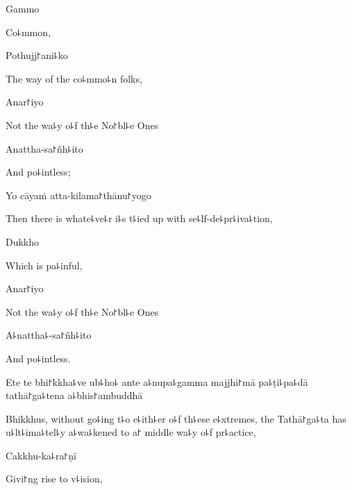 Gammo

\begin{english}
  Co꜕mmon,
\end{english}

Pothujj꜓ani꜕ko

\begin{english}
  The way of the co꜕mmo꜕n folks,
\end{english}

Anar꜓iyo

\begin{english}
  Not the wa꜕y o꜕f th꜕e No꜓bl꜕e Ones
\end{english}

\clearpage

Anattha-sa꜓ñh꜕ito

\begin{english}
  And po꜕intless;
\end{english}

Yo cāyaṁ atta-kilama꜓thānu꜓yogo

\begin{english}
  Then there is whate꜕ve꜕r i꜕s t꜕ied up with se꜕lf-de꜕pr꜕iva꜕tion,
\end{english}

Dukkho

\begin{english}
  Which is pa꜕inful,
\end{english}

Anar꜓iyo

\begin{english}
  Not the wa꜕y o꜕f th꜕e No꜓bl꜕e Ones
\end{english}

A꜕nattha꜕-sa꜓ñh꜕ito

\begin{english}
  And po꜕intless.
\end{english}

Ete te bhi꜓kkha꜕ve ub꜕ho꜕ ante a꜕nupa꜕gamma majjhi꜓mā pa꜕ṭi꜕pa꜕dā tathā꜓ga꜕tena a꜕bhis꜓ambuddhā

\begin{english}
  Bhikkhus, without go꜕ing t꜕o e꜕ith꜕er o꜕f th꜕ese e꜕xtremes, the
  Tathā꜓ga꜕ta has u꜕lt꜕ima꜕tel꜕y a꜕wa꜕kened to a꜓ middle wa꜕y o꜕f
  pr꜕actice,
\end{english}

Cakkhu-ka꜕ra꜓ṇī

\begin{english}
  Givi꜓ng rise to v꜕ision,
\end{english}

